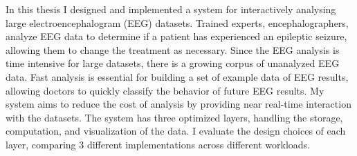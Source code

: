 % 
% 
%

In this thesis I designed and implemented a system for interactively analysing
large electroencephalogram (EEG) datasets. Trained experts, encephalographers,
analyze EEG data to determine if a patient has experienced an epileptic
seizure, allowing them to change the treatment as necessary.  Since the EEG
analysis is time intensive for large datasets, there is a growing corpus of
unanalyzed EEG data.  Fast analysis is essential for building a set of example
data of EEG results, allowing doctors to quickly classify the behavior of
future EEG results. My system aims to reduce the cost of analysis by providing
near real-time interaction with the datasets. The system has three optimized
layers, handling the storage, computation, and visualization of the data. I
evaluate the design choices of each layer, comparing 3 different
implementations across different workloads.
